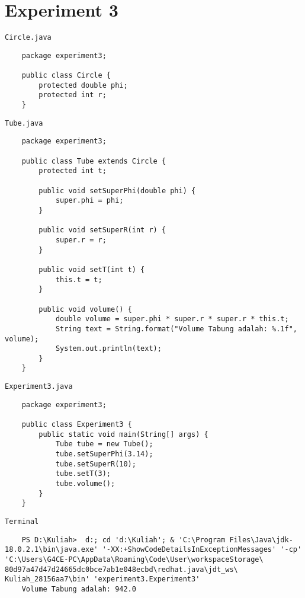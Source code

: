 \documentclass[12pt,titlepage]{article}
\begin{document}
\section{Experiment 3}
\texttt{Circle.java}
\begin{verbatim}
    package experiment3;

    public class Circle {
        protected double phi;
        protected int r;
    }
\end{verbatim}

\texttt{Tube.java}
\begin{verbatim}
    package experiment3;

    public class Tube extends Circle {
        protected int t;
        
        public void setSuperPhi(double phi) {
            super.phi = phi;
        }
        
        public void setSuperR(int r) {
            super.r = r;
        }

        public void setT(int t) {
            this.t = t;
        }

        public void volume() {
            double volume = super.phi * super.r * super.r * this.t;
            String text = String.format("Volume Tabung adalah: %.1f", volume);
            System.out.println(text);
        }
    }
\end{verbatim}

\texttt{Experiment3.java}
\begin{verbatim}
    package experiment3;

    public class Experiment3 {
        public static void main(String[] args) {
            Tube tube = new Tube();
            tube.setSuperPhi(3.14);
            tube.setSuperR(10);
            tube.setT(3);
            tube.volume();
        }
    }
\end{verbatim}

\texttt{Terminal}
\begin{verbatim}
    PS D:\Kuliah>  d:; cd 'd:\Kuliah'; & 'C:\Program Files\Java\jdk-18.0.2.1\bin\java.exe' '-XX:+ShowCodeDetailsInExceptionMessages' '-cp' 'C:\Users\G4CE-PC\AppData\Roaming\Code\User\workspaceStorage\ 80d97a47d47d24665dc0bce7ab1e048ecbd\redhat.java\jdt_ws\ Kuliah_28156aa7\bin' 'experiment3.Experiment3'
    Volume Tabung adalah: 942.0
\end{verbatim}

\newpage
\end{document}
